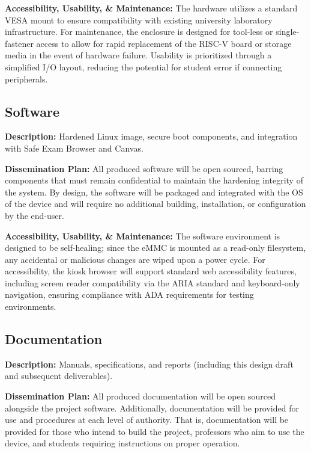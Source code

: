 \documentclass[11pt]{article}
\begin{document}
\textbf{Accessibility, Usability, \& Maintenance:} 
The hardware utilizes a standard VESA mount to ensure compatibility with existing university laboratory infrastructure.
For maintenance, the enclosure is designed for tool-less or single-fastener access to allow for rapid replacement of the RISC-V board or storage media in the event of hardware failure.
Usability is prioritized through a simplified I/O layout, reducing the potential for student error if connecting peripherals.

\subsection{Software}

\textbf{Description:} 
Hardened Linux image, secure boot components, and integration with Safe Exam Browser and Canvas.

\textbf{Dissemination Plan:} 
All produced software will be open sourced, barring components that must remain confidential to maintain the hardening integrity of the system.
By design, the software will be packaged and integrated with the OS of the device and will require no additional building, installation, or configuration by the end-user.

\textbf{Accessibility, Usability, \& Maintenance:} 
The software environment is designed to be self-healing; since the eMMC is mounted as a read-only filesystem, any accidental or malicious changes are wiped upon a power cycle. For accessibility, the kiosk browser will support standard web accessibility features, including screen reader compatibility via the ARIA standard and keyboard-only navigation, ensuring compliance with ADA requirements for testing environments.

\newpage
\subsection{Documentation}

\textbf{Description:} 
Manuals, specifications, and reports (including this design draft and subsequent deliverables).

\textbf{Dissemination Plan:} 
All produced documentation will be open sourced alongside the project software.
Additionally, documentation will be provided for use and procedures at each level of authority.
That is, documentation will be provided for those who intend to build the project, professors who aim to use the device, and students requiring instructions on proper operation.
\end{document}
